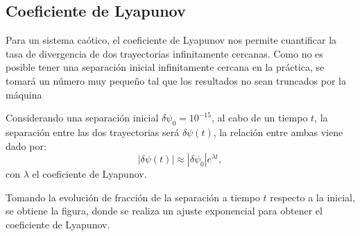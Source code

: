 \documentclass[11pt, twoside]{article} %
\begin{document}
\subsection{Coeficiente de Lyapunov}

Para un sistema caótico, el coeficiente de Lyapunov nos permite
cuantificar la tasa de divergencia de dos trayectorias infinitamente
cercanas. Como no es posible tener una separación inicial infinitamente
cercana en la práctica, se tomará un número muy pequeño tal que los
resultados no sean truncados por la máquina

Considerando una separación inicial $\delta \psi_0 = 10^{-15}$, 
al cabo de un tiempo $t$, la separación entre las dos trayectorias será 
$\delta \psi (t)$, la relación entre ambas viene dado por:
\begin{equation}
    |\delta \psi (t)| \approx |\delta \psi_0| e^{\lambda t}, 
\end{equation}
con $\lambda$ el coeficiente de Lyapunov.

Tomando la evolución de fracción de la separación a tiempo $t$ respecto 
a la inicial, se obtiene la figura, donde se realiza un ajuste exponencial
para obtener el coeficiente de Lyapunov.
\end{document}
